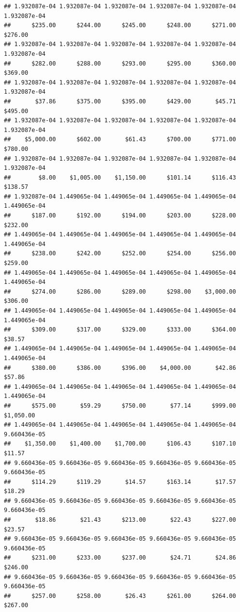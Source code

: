 \begin{verbatim}
## 1.932087e-04 1.932087e-04 1.932087e-04 1.932087e-04 1.932087e-04 1.932087e-04 
##      $235.00      $244.00      $245.00      $248.00      $271.00      $276.00 
## 1.932087e-04 1.932087e-04 1.932087e-04 1.932087e-04 1.932087e-04 1.932087e-04 
##      $282.00      $288.00      $293.00      $295.00      $360.00      $369.00 
## 1.932087e-04 1.932087e-04 1.932087e-04 1.932087e-04 1.932087e-04 1.932087e-04 
##       $37.86      $375.00      $395.00      $429.00       $45.71      $495.00 
## 1.932087e-04 1.932087e-04 1.932087e-04 1.932087e-04 1.932087e-04 1.932087e-04 
##    $5,000.00      $602.00       $61.43      $700.00      $771.00      $780.00 
## 1.932087e-04 1.932087e-04 1.932087e-04 1.932087e-04 1.932087e-04 1.932087e-04 
##        $8.00    $1,005.00    $1,150.00      $101.14      $116.43      $138.57 
## 1.932087e-04 1.449065e-04 1.449065e-04 1.449065e-04 1.449065e-04 1.449065e-04 
##      $187.00      $192.00      $194.00      $203.00      $228.00      $232.00 
## 1.449065e-04 1.449065e-04 1.449065e-04 1.449065e-04 1.449065e-04 1.449065e-04 
##      $238.00      $242.00      $252.00      $254.00      $256.00      $259.00 
## 1.449065e-04 1.449065e-04 1.449065e-04 1.449065e-04 1.449065e-04 1.449065e-04 
##      $274.00      $286.00      $289.00      $298.00    $3,000.00      $306.00 
## 1.449065e-04 1.449065e-04 1.449065e-04 1.449065e-04 1.449065e-04 1.449065e-04 
##      $309.00      $317.00      $329.00      $333.00      $364.00       $38.57 
## 1.449065e-04 1.449065e-04 1.449065e-04 1.449065e-04 1.449065e-04 1.449065e-04 
##      $380.00      $386.00      $396.00    $4,000.00       $42.86       $57.86 
## 1.449065e-04 1.449065e-04 1.449065e-04 1.449065e-04 1.449065e-04 1.449065e-04 
##      $575.00       $59.29      $750.00       $77.14      $999.00    $1,050.00 
## 1.449065e-04 1.449065e-04 1.449065e-04 1.449065e-04 1.449065e-04 9.660436e-05 
##    $1,350.00    $1,400.00    $1,700.00      $106.43      $107.10       $11.57 
## 9.660436e-05 9.660436e-05 9.660436e-05 9.660436e-05 9.660436e-05 9.660436e-05 
##      $114.29      $119.29       $14.57      $163.14       $17.57       $18.29 
## 9.660436e-05 9.660436e-05 9.660436e-05 9.660436e-05 9.660436e-05 9.660436e-05 
##       $18.86       $21.43      $213.00       $22.43      $227.00       $23.57 
## 9.660436e-05 9.660436e-05 9.660436e-05 9.660436e-05 9.660436e-05 9.660436e-05 
##      $231.00      $233.00      $237.00       $24.71       $24.86      $246.00 
## 9.660436e-05 9.660436e-05 9.660436e-05 9.660436e-05 9.660436e-05 9.660436e-05 
##      $257.00      $258.00       $26.43      $261.00      $264.00      $267.00 

\end{verbatim}
